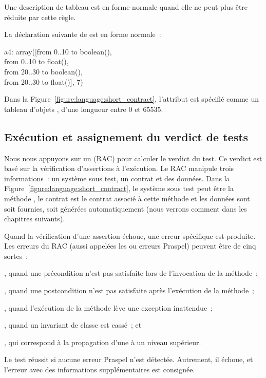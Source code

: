 Une description de tableau est en forme normale quand elle ne peut plus être
réduite par cette règle.

\begin{example}

La déclaration suivante de  est en forme normale~:

\begin{pre}
a4: array([from  0..10 to boolean(), \\
           from  0..10 to float(), \\
           from 20..30 to boolean(), \\
           from 20..30 to float()], 7)
\end{pre}

\end{example}

Dans la Figure~\ref{figure:language:short_contract}, l'attribut  est
spécifié comme un tableau d'objets , d'une longueur entre 0 et 65535.

\subsection{Exécution et assignement du verdict de tests}
\label{subsection:language:verdict}

Nous nous appuyons sur un  (RAC) pour
calculer le verdict du test. Ce verdict est basé sur la vérification
d'assertions à l'exécution. Le RAC manipule trois informations~: un système sous
test, un contrat et des données. Dans la
Figure~\ref{figure:language:short_contract}, le système sous test peut être la
méthode , le contrat est le contrat associé à cette méthode et les
données sont soit fournies, soit générées automatiquement (nous verrons comment
dans les chapitres suivants).

Quand la vérification d'une assertion échoue, une erreur spécifique est
produite. Les erreurs du RAC (aussi appelées les 
ou erreurs Praspel) peuvent être de cinq sortes~:
%
\begin{inparaenum}[$(i)$]
%
\item {}, quand une précondition n'est pas
satisfaite lors de l'invocation de la méthode~;
%
\item {}, quand une postcondition n'est pas
satisfaite après l'exécution de la méthode~;
%
\item {}, quand l'exécution de la méthode lève une
exception inattendue~;
%
\item {}, quand un invariant de classe est cassé~; et
%
\item {}, qui correspond à la propagation
d'une  à un niveau supérieur.
%
\end{inparaenum}

Le test réussit si aucune erreur Praspel n'est détectée. Autrement, il échoue,
et l'erreur avec des informations supplémentaires est consignée.
